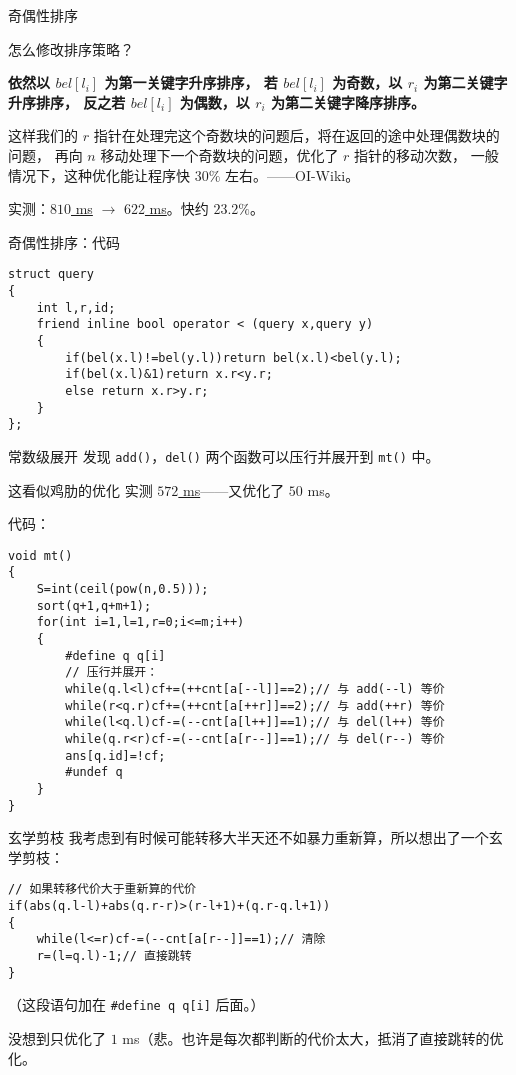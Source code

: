 \documentclass[table]{beamer}
\begin{document}
\begin{frame}{奇偶性排序}

	怎么修改排序策略？

	\textbf{依然以 $bel[l_i]$ 为第一关键字升序排序，
	若 $bel[l_i]$ 为奇数，以 $r_i$ 为第二关键字升序排序，
	反之若 $bel[l_i]$ 为偶数，以 $r_i$ 为第二关键字降序排序。}
	\pause

	这样我们的 $r$ 指针在处理完这个奇数块的问题后，将在返回的途中处理偶数块的问题，
	再向 $n$ 移动处理下一个奇数块的问题，优化了 $r$ 指针的移动次数，
	一般情况下，这种优化能让程序快 $30\%$ 左右。——OI-Wiki。
	\pause

	实测：\href{https://www.luogu.com.cn/record/137463623}{\color{blue}$810$ ms} $\to$
	\href{https://www.luogu.com.cn/record/137467226}{\color{blue}$622$ ms}。快约 $23.2\%$。

\end{frame}

\begin{frame}[fragile]{奇偶性排序：代码}
\begin{verbatim}
struct query
{
    int l,r,id;
    friend inline bool operator < (query x,query y)
    {
        if(bel(x.l)!=bel(y.l))return bel(x.l)<bel(y.l);
        if(bel(x.l)&1)return x.r<y.r;
        else return x.r>y.r;
    }
};
\end{verbatim}
\end{frame}

\begin{frame}[fragile]{常数级展开}
	发现 \verb|add()|，\verb|del()| 两个函数可以压行并展开到 \verb|mt()| 中。
	
	这看似鸡肋的优化
	实测 \href{https://www.luogu.com.cn/record/137468354}{\color{blue}$572$ ms}——又优化了 $50$ ms。
	\pause

	代码：\scriptsize
\begin{verbatim}
void mt()
{
    S=int(ceil(pow(n,0.5)));
    sort(q+1,q+m+1);
    for(int i=1,l=1,r=0;i<=m;i++)
    {
        #define q q[i]
        // 压行并展开：
        while(q.l<l)cf+=(++cnt[a[--l]]==2);// 与 add(--l) 等价
        while(r<q.r)cf+=(++cnt[a[++r]]==2);// 与 add(++r) 等价
        while(l<q.l)cf-=(--cnt[a[l++]]==1);// 与 del(l++) 等价
        while(q.r<r)cf-=(--cnt[a[r--]]==1);// 与 del(r--) 等价
        ans[q.id]=!cf;
        #undef q
    }
}
\end{verbatim}
\end{frame}

\begin{frame}[fragile]{玄学剪枝}
	我考虑到有时候可能转移大半天还不如暴力重新算，所以想出了一个玄学剪枝：
	\begin{verbatim}
// 如果转移代价大于重新算的代价
if(abs(q.l-l)+abs(q.r-r)>(r-l+1)+(q.r-q.l+1))
{
    while(l<=r)cf-=(--cnt[a[r--]]==1);// 清除
    r=(l=q.l)-1;// 直接跳转
}
\end{verbatim}
	（这段语句加在 \verb|#define q q[i]| 后面。）

	没想到只优化了 $1$ ms（悲。也许是每次都判断的代价太大，抵消了直接跳转的优化。
\end{frame}
\end{document}
